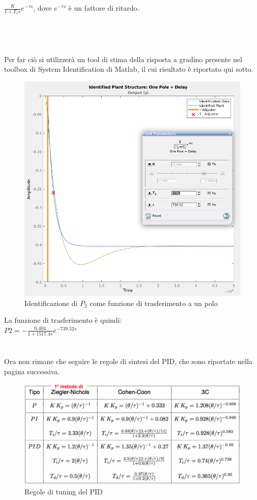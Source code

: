 \documentclass[Lau,noexaminfo]{sapthesis}
\begin{document}
 	$\frac{K}{1+T_1 s} e^{-\tau s}$, dove $e^{-\tau s}$ è un fattore di ritardo.\\\\\\\\\\Per far ciò si utilizzerà un tool di stima della risposta a gradino presente nel toolbox di System Identification di Matlab, il cui risultato è riportato qui sotto.
 	\begin{figure}[h]
 		\centering
 		 \includegraphics[scale=0.46]{P2_estimating1}
 		 \caption{Identificazione di $P_2$ come funzione di trasferimento a un polo}
 	\end{figure}
	La funzione di trasferimento è quindi:\\
	$P2=-\frac{0.404}{1+1517.4s}e^{-739.52s}$\\\\\\
	Ora non rimane che seguire le regole di sintesi del PID, che sono riportate nella pagina successiva.
	\begin{figure}[h]
		\centering
			\includegraphics[height=0.27\textheight,]{Regole_PID}
			\caption{Regole di tuning del PID}
	\end{figure}
\end{document}
